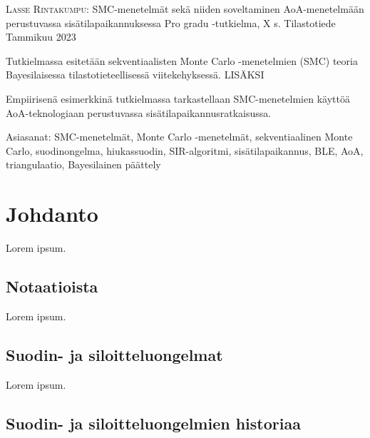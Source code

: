 \documentclass[
  12pt,
  a4paper, twoside]{book}
\newcommand{\tekija}{{Lasse Rintakumpu}}
\newcommand{\otsikko}{{SMC-menetelmät sekä niiden soveltaminen AoA-menetelmään perustuvassa sisätilapaikannuksessa}}
\newcommand{\tutkielma}{{Pro gradu }}
\newcommand{\aika}{{Tammikuu 2023}}
\newcommand{\paaaine}{{Tilastotiede}}
\theoremstyle{definition}
\theoremstyle{definition}
\theoremstyle{definition}
\theoremstyle{definition}
\theoremstyle{remark}
\begin{document}
\noindent \textsc{\tekija}: \otsikko \newline
\tutkielma-tutkielma, X s. \newline
\paaaine \newline
\aika
\par\noindent{\rule{\textwidth}{.2mm}} \newline


\vspace{4mm}\noindent Tutkielmassa esitetään sekventiaalisten Monte Carlo -menetelmien (SMC) teoria Bayesilaisessa tilastotieteellisessä viitekehyksessä. LISÄKSI

\vspace{4mm}\noindent Empiirisenä esimerkkinä tutkielmassa tarkastellaan SMC-menetelmien käyttöä AoA-teknologiaan perustuvassa sisätilapaikannusratkaisussa.

\vspace{4mm}\noindent Asiasanat: SMC-menetelmät, Monte Carlo -menetelmät, sekventiaalinen Monte Carlo, suodinongelma, hiukassuodin, SIR-algoritmi, sisätilapaikannus, BLE, AoA, triangulaatio, Bayesilainen päättely

\cleardoublepage

\cleardoublepage

\pagestyle{plain} 

{
\hypersetup{linkcolor=blue}
\setcounter{tocdepth}{2}
\tableofcontents
}
\setlength\parindent{24pt}
\setlength\parskip{3pt}

\hypertarget{johdanto}{%
\chapter{Johdanto}\label{johdanto}}

Lorem ipsum.

\hypertarget{notaatioista}{%
\section{Notaatioista}\label{notaatioista}}

Lorem ipsum.

\hypertarget{suodin--ja-siloitteluongelmat}{%
\section{Suodin- ja siloitteluongelmat}\label{suodin--ja-siloitteluongelmat}}

Lorem ipsum.

\hypertarget{suodin--ja-siloitteluongelmien-historiaa}{%
\section{Suodin- ja siloitteluongelmien historiaa}\label{suodin--ja-siloitteluongelmien-historiaa}}
\end{document}
